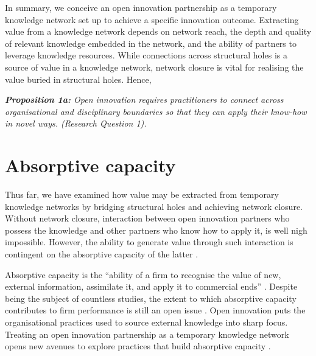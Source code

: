 In summary, we conceive an open innovation partnership as a temporary knowledge network set up to achieve a specific innovation outcome. Extracting value from a knowledge network depends on network reach, the depth and quality of relevant knowledge embedded in the network, and the ability of partners to leverage knowledge resources. While connections across structural holes is a source of value in a knowledge network, network closure is vital for realising the value buried in structural holes. Hence, \bigskip

\begin{tcolorbox}
\textit{\textbf{Proposition 1a:} Open  innovation  requires  practitioners  to  connect across organisational and disciplinary boundaries so that they can apply their know-how in novel ways. (Research Question 1).}
\end{tcolorbox}

\section{Absorptive capacity} 

Thus far, we have examined how value may be extracted from temporary knowledge networks by bridging structural holes and achieving network closure. Without network closure, interaction between open innovation partners who possess the knowledge and other partners who know how to apply it, is well nigh impossible. However, the ability to generate value through such interaction is contingent on the absorptive capacity of the latter \citep{vanhaverbeke2007connecting,lichtenthaler2009capability,robertson2012managing,xia2016unpacking}. \medskip

Absorptive capacity is the \enquote{ability of a firm to recognise the value of new, external information, assimilate it, and apply it to commercial ends} \citep{cohen1990absorptive}. Despite being the subject of countless studies, the extent to which absorptive capacity contributes to firm performance is still an open issue \citep{omidvar2013revisiting,duchek2013capturing}. Open innovation puts the organisational practices used to source external knowledge into sharp focus. Treating an open innovation partnership as a temporary knowledge network opens new avenues to explore practices that build absorptive capacity \citep{vanhaverbeke2007connecting,xia2016unpacking}. \medskip

